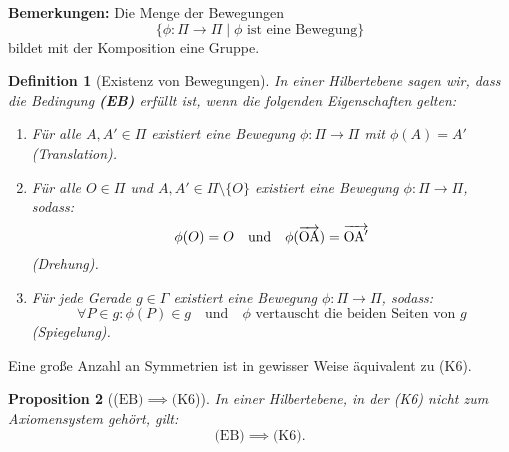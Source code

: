 \documentclass[a4paper,12pt]{article}
\theoremstyle{break}
\newtheorem{definition}{Definition}[section]
\newtheorem{proposition}[definition]{Proposition}
\begin{document}
\textbf{Bemerkungen:}
Die Menge der Bewegungen 
\[
\{\phi: \Pi \to \Pi \mid \phi \text{ ist eine Bewegung}\}
\]
bildet mit der Komposition eine Gruppe.

\begin{definition}[Existenz von Bewegungen]
In einer Hilbertebene sagen wir, dass die Bedingung \textbf{(EB)} erfüllt ist, wenn die folgenden Eigenschaften gelten:
\begin{enumerate}
    \item  Für alle \(A, A' \in \Pi\) existiert eine Bewegung \(\phi: \Pi \to \Pi\) mit \(\phi(A) = A'\) (Translation). 
    \item Für alle \(O \in \Pi\) und \(A, A' \in \Pi \setminus \{O\}\) existiert eine Bewegung \(\phi: \Pi \to \Pi\), sodass:
    \[
    \phi(O) = O \quad \text{und} \quad \phi(\overrightarrow{\rm OA}) = \overrightarrow{\rm OA'}
    \] (Drehung).
    \item Für jede Gerade \(g \in \Gamma\) existiert eine Bewegung \(\phi: \Pi \to \Pi\), sodass:
    \[
    \forall P \in g : \phi(P) \in g \quad \text{und} \quad \phi \text{ vertauscht die beiden Seiten von } g
    \] (Spiegelung).
\end{enumerate}
\end{definition}

Eine große Anzahl an Symmetrien ist in gewisser Weise äquivalent zu (K6).

\begin{proposition}[(\(\text{EB}) \implies (\text{K6}\))]
In einer Hilbertebene, in der (K6) nicht zum Axiomensystem gehört, gilt:
\[
\text{(EB)} \implies \text{(K6)}.
\]
\end{proposition}
\end{document}

